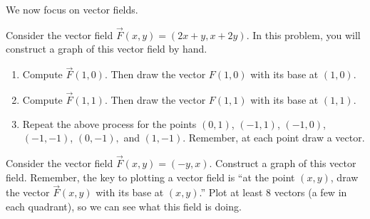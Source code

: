 We now focus on vector fields.

\begin{problem}%
%
 Consider the vector field $\vec F(x,y)=(2x+y,x+2y)$.  In this problem, you will construct a graph of this vector field by hand.
\begin{enumerate}
 \item Compute $\vec F(1,0)$. Then draw the vector $F(1,0)$ with its base at $(1,0)$.
 \item Compute $\vec F(1,1)$. Then draw the vector $F(1,1)$ with its base at $(1,1)$.
 \item Repeat the above process for the points $(0,1)$, $(-1,1)$, $(-1,0)$, $(-1,-1)$, $(0,-1),$ and $(1,-1)$. Remember, at each point draw a vector.  
\end{enumerate}
\end{problem}


\begin{problem}
%
 Consider the vector field $\vec F(x,y)=(-y,x)$. Construct a graph of this vector field. Remember, the key to plotting a vector field is ``at the point $(x,y)$, draw the vector $\vec F(x,y)$ with its base at $(x,y)$.''  Plot at least 8 vectors (a few in each quadrant), so we can see what this field is doing.
\end{problem}


